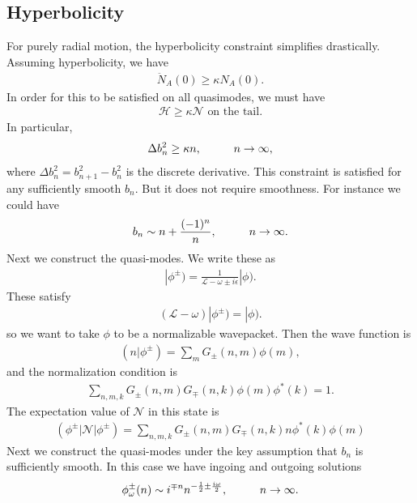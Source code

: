 \documentclass[JHEP,12pt]{article}
\begin{document}
\subsection{Hyperbolicity}
\indent For purely radial motion, the hyperbolicity constraint simplifies drastically. Assuming hyperbolicity, we have 
\begin{align}
\ddot{N}_A(0)\ge \kappa N_A(0).
\end{align}
In order for this to be satisfied on all quasimodes, we must have
\begin{align}
\mathcal{H}\ge \kappa \mathcal{N}\text{ on the tail}.
\end{align}
In particular, 
\begin{align}
\Delta b_n^2\ge \kappa n,\hspace{10 mm}n\to \infty,
\end{align}
where $\Delta b_n^2=b_{n+1}^2-b_n^2$ is the discrete derivative. This constraint is satisfied for any sufficiently smooth $b_n$. But it does not require smoothness. For instance we could have 
\begin{align}
b_n\sim n+\frac{(-1)^n}{n},\hspace{10 mm}n\to \infty.
\end{align}
\indent Next we construct the quasi-modes. We write these as 
\begin{align}
|\phi^{\pm})=\frac{1}{\mathcal{L}-\omega\pm i\epsilon}|\phi).
\end{align}
These satisfy 
\begin{align}
(\mathcal{L}-\omega)|\phi^{\pm})=|\phi).
\end{align}
so we want to take $\phi$ to be a normalizable wavepacket. Then the wave function is 
\begin{align}
(n|\phi^{\pm})=\sum_m G_{\pm}(n,m)\phi(m),
\end{align}
and the normalization condition is 
\begin{align}
\sum_{n,
m,k}G_{\pm}(n,m)G_{\mp}(n,k)\phi(m)\phi^*(k)=1.
\end{align}
The expectation value of $\mathcal{N}$ in this state is 
\begin{align}
(\phi^{\pm}|\mathcal{N}|\phi^{\pm})=\sum_{n,m,k}G_{\pm}(n,m)G_{\mp}(n,k)n\phi^*(k)\phi(m)
\end{align}
\indent Next we construct the quasi-modes under the key assumption that $b_n$ is sufficiently smooth. In this case we have ingoing and outgoing solutions
\begin{align}
\phi^{\pm}_\omega(n)\sim i^{\mp n} n^{-\frac{1}{2}\pm \frac{i\omega}{2}},\hspace{10 mm}n\to \infty.
\end{align}
\end{document}
